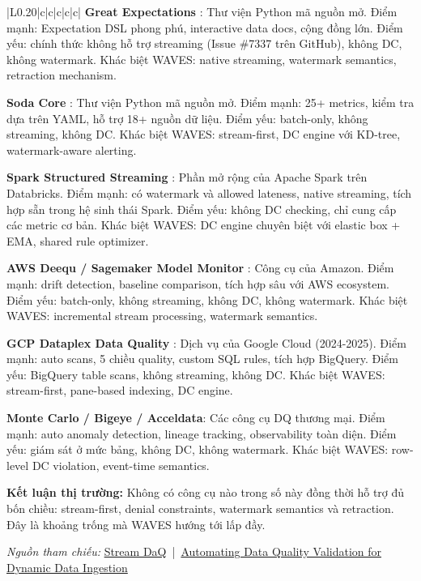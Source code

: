 {\begin{longtable}{|L{0.20\textwidth}|c|c|c|c|c|}
\medskip\noindent\textbf{Great Expectations} \cite{greatexp}: Thư viện Python mã nguồn mở. Điểm mạnh: Expectation DSL phong phú, interactive data docs, cộng đồng lớn. Điểm yếu: chính thức không hỗ trợ streaming (Issue \#7337 trên GitHub), không DC, không watermark. Khác biệt WAVES: native streaming, watermark semantics, retraction mechanism.

\medskip\noindent\textbf{Soda Core} \cite{sodacore}: Thư viện Python mã nguồn mở. Điểm mạnh: 25+ metrics, kiểm tra dựa trên YAML, hỗ trợ 18+ nguồn dữ liệu. Điểm yếu: batch-only, không streaming, không DC. Khác biệt WAVES: stream-first, DC engine với KD-tree, watermark-aware alerting.

\medskip\noindent\textbf{Spark Structured Streaming} \cite{sparkstreaming}: Phần mở rộng của Apache Spark trên Databricks. Điểm mạnh: có watermark và allowed lateness, native streaming, tích hợp sẵn trong hệ sinh thái Spark. Điểm yếu: không DC checking, chỉ cung cấp các metric cơ bản. Khác biệt WAVES: DC engine chuyên biệt với elastic box + EMA, shared rule optimizer.

\medskip\noindent\textbf{AWS Deequ / Sagemaker Model Monitor} \cite{deequ}: Công cụ của Amazon. Điểm mạnh: drift detection, baseline comparison, tích hợp sâu với AWS ecosystem. Điểm yếu: batch-only, không streaming, không DC, không watermark. Khác biệt WAVES: incremental stream processing, watermark semantics.

\medskip\noindent\textbf{GCP Dataplex Data Quality} \cite{dataplex}: Dịch vụ của Google Cloud (2024-2025). Điểm mạnh: auto scans, 5 chiều quality, custom SQL rules, tích hợp BigQuery. Điểm yếu: BigQuery table scans, không streaming, không DC. Khác biệt WAVES: stream-first, pane-based indexing, DC engine.

\medskip\noindent\textbf{Monte Carlo / Bigeye / Acceldata}: Các công cụ DQ thương mại. Điểm mạnh: auto anomaly detection, lineage tracking, observability toàn diện. Điểm yếu: giám sát ở mức bảng, không DC, không watermark. Khác biệt WAVES: row-level DC violation, event-time semantics.

\textbf{Kết luận thị trường:} Không có công cụ nào trong số này đồng thời hỗ trợ đủ bốn chiều: stream-first, denial constraints, watermark semantics và retraction. Đây là khoảng trống mà WAVES hướng tới lấp đầy.

\noindent \textit{Nguồn tham chiếu: }
\href{https://arxiv.org/abs/2506.06147}{Stream DaQ} \,|\, \href{https://openproceedings.org/2021/conf/edbt/p79.pdf}{Automating Data Quality Validation for Dynamic Data Ingestion}


\end{longtable}}
